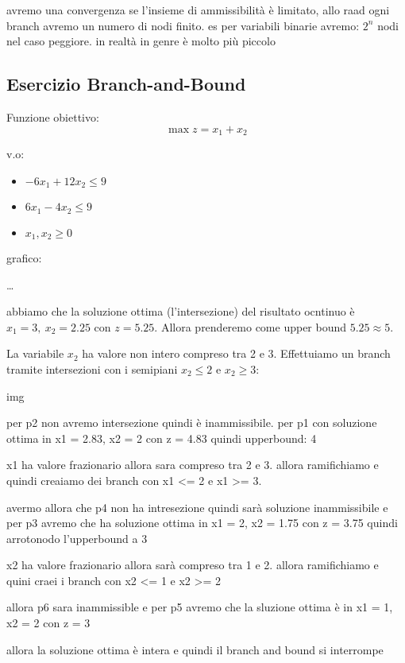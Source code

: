 avremo una convergenza se l'insieme di ammissibilità è limitato, allo raad ogni branch avremo un numero di nodi finito. es per variabili binarie avremo: $2^n$ nodi nel caso peggiore. in realtà in genre è molto più piccolo


\subsection{Esercizio Branch-and-Bound}

Funzione obiettivo:
$$\max z = x_1 + x_2$$

v.o:

\begin{itemize}
    \item $-6x_1 + 12x_2 \leq 9$
    \item $6x_1 - 4x_2 \leq 9$
    \item $x_1, x_2 \geq 0$
\end{itemize}

grafico:

\dots

abbiamo che la soluzione ottima (l'intersezione) del risultato ocntinuo è $x_1 = 3,\ x_2 = 2.25$ con $z = 5.25$. Allora prenderemo come upper bound $5.25 \approx 5$.

La variabile $x_2$ ha valore non intero compreso tra 2 e 3. Effettuiamo un branch tramite intersezioni con i semipiani $x_2 \leq 2$ e $x_2 \geq 3$:

img

per p2 non avremo intersezione quindi è inammissibile. per p1 con soluzione ottima in x1 = 2.83, x2 = 2 con z = 4.83 quindi upperbound: 4

x1 ha valore frazionario allora sara compreso tra 2 e 3. allora ramifichiamo e quindi creaiamo dei branch con x1 <= 2 e x1 >= 3.

avermo allora che p4 non ha intresezione quindi sarà soluzione inammissibile e per p3 avremo che ha soluzione ottima in x1 = 2, x2 = 1.75 con z = 3.75 quindi arrotonodo l'upperbound a 3

x2 ha valore frazionario allora sarà compreso tra 1 e 2. allora ramifichiamo e quini craei i branch con x2 <= 1 e x2 >= 2

allora p6 sara inammissible e per p5 avremo che la sluzione ottima è in x1 = 1, x2 = 2 con z = 3

allora la soluzione ottima è intera e quindi il branch and bound si interrompe